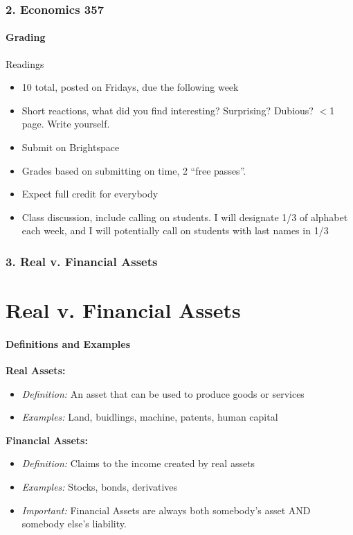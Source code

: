 \documentclass{beamer}
\begin{document}
\begin{frame}[t]
    \frametitle{2. Economics 357}
    \framesubtitle{Grading}

    Readings
    \begin{itemize}
        \item 10 total, posted on Fridays, due the following week
        \item Short reactions, what did you find interesting? Surprising? Dubious? $<$1 page. Write yourself.
        \item Submit on Brightspace
        \item Grades based on submitting on time, 2 “free passes”.
        \item Expect full credit for everybody
        \item Class discussion, include calling on students. I will designate 1/3 of alphabet each week, and I will potentially call on students with last names in 1/3
    \end{itemize}

\end{frame}

\begin{frame}[t]
    \frametitle{3. Real v. Financial Assets}
    \section{Real v. Financial Assets}
    \framesubtitle{Definitions and Examples}
    \textbf{Real Assets:}
    \begin{itemize}
        \item \textit{Definition:} An asset that can be used to produce goods or services
        \item \textit{Examples:} Land, buidlings, machine, patents, human capital
    \end{itemize}
    \vspace{1em}

    \textbf{Financial Assets:}
    \begin{itemize}
        \item \textit{Definition:} Claims to the income created by real assets
        \item \textit{Examples:} Stocks, bonds, derivatives
        \item \textit{Important:} Financial Assets are always both somebody's asset AND somebody else's liability.
    \end{itemize}

\end{frame}
\end{document}
